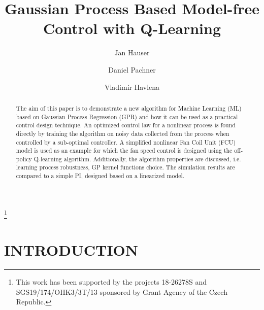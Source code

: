 \documentclass{ifacconf}
\begin{document}
\begin{frontmatter}

\title{\LARGE \bf
 Gaussian Process Based Model-free Control with Q-Learning} 

\thanks[footnoteinfo]{This work has been supported by the projects 18-26278S and SGS19/174/OHK3/3T/13 sponsored by Grant Agency of the Czech Republic.}

\author[First]{Jan Hauser} 
\author[Second]{Daniel Pachner} 
\author[First]{Vladimír Havlena}

\address[First]{Department of Control Engineering, 
Faculty of Electrical Engineering of Czech Technical University in Prague, Technicka 2, 166 27 Praha 6, Czech Republic (e-mail: \{hauseja3,havlena\}@fel.cvut.cz)}
\address[Second]{Honeywell HBT Architecture $\&$ Innovation Team, V Parku 2326/18, 148 00 Prague, Czech Republic (e-mail: daniel.pachner@honeywell.com)}

\begin{abstract}
The aim of this paper is to demonstrate a new algorithm for Machine Learning (ML) based on Gaussian Process Regression (GPR) and how it can be used as a practical control design technique. An optimized control law for a nonlinear process is found directly by training the algorithm on noisy data collected from the process when controlled by a sub-optimal controller. A simplified nonlinear Fan Coil Unit (FCU) model is used as an example for which the fan speed control is designed using the off-policy Q-learning algorithm. Additionally, the algorithm properties are discussed, i.e. learning process robustness, GP kernel functions choice. The simulation results are compared to a simple PI, designed based on a linearized model.
\end{abstract}

\end{frontmatter}

\section{INTRODUCTION}
\end{document}
